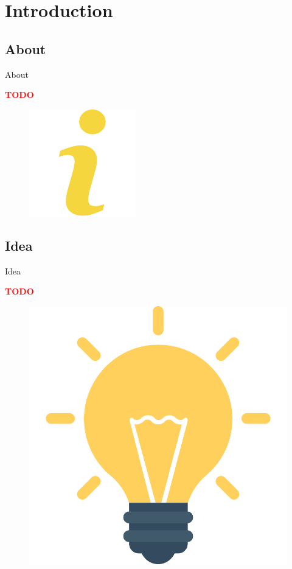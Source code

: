 \documentclass[]{beamer}
\newcommand{\TODO}{\textbf{\textcolor{red}{TODO}}} %
\begin{document}


\section[Introduction]{Introduction}

  \subsection{About}

    \begin{frame}{About}
      \setlength{\columnsep}{-125mm}
      \begin{adjustwidth}{20mm}{-25mm}
        \begin{multicols}{2}
          \TODO

          \columnbreak

          \begin{figure}[H]
            \includegraphics[width=.25\textwidth,height=.25\textheight,keepaspectratio]{img/info.pdf}
          \end{figure}
        \end{multicols}
      \end{adjustwidth}
    \end{frame}

  \subsection{Idea}

    \begin{frame}{Idea}
      \setlength{\columnsep}{-125mm}
      \begin{adjustwidth}{20mm}{-25mm}
        \begin{multicols}{2}
          \TODO

          \columnbreak

          \begin{figure}[H]
            \includegraphics[width=.35\textwidth,height=.35\textheight,keepaspectratio]{img/idea.pdf}
          \end{figure}
        \end{multicols}
      \end{adjustwidth}
    \end{frame}
\end{document}
